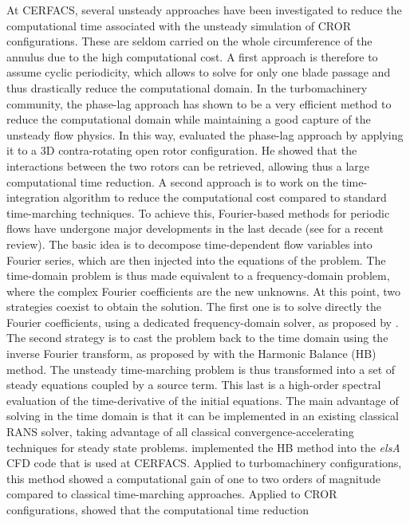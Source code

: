 At CERFACS, several unsteady approaches have been investigated 
to reduce the computational time associated with the unsteady simulation of 
CROR configurations. 
These are seldom carried on the whole
circumference of the annulus due to the high computational
cost. A first approach is therefore to assume cyclic periodicity,
which allows to solve for only one blade passage and thus drastically
reduce the computational domain. 
In the turbomachinery community, the phase-lag approach has shown to be
a very efficient method to reduce the computational domain while
maintaining a good capture of the unsteady flow physics. 
In this way, \citet{Burnazzi2010} evaluated the phase-lag approach
by applying it
to a 3D contra-rotating open rotor configuration. He showed
that the interactions between the two rotors can be retrieved, allowing
thus a large computational time reduction.
A second approach 
is to work on the time-integration algorithm to reduce
the computational cost compared to standard time-marching techniques. To achieve
this, Fourier-based methods for periodic flows have undergone major
developments in the last decade (see \citet{He2010} for a recent
review).  The basic idea is to decompose
time-dependent flow variables into Fourier series, which are then
injected into the equations of the problem. The time-domain problem is
thus made equivalent to a frequency-domain problem, where the complex
Fourier coefficients are the new unknowns. At this point, two
strategies coexist to obtain the solution. The first one is to solve
directly the Fourier coefficients, using a dedicated
frequency-domain solver, as proposed by \citet{He1998}. The second strategy is to cast the
problem back to the time domain using the inverse Fourier transform, as
proposed by \citet{Hall2002} with the Harmonic
Balance (HB) method. The unsteady time-marching problem is thus
transformed into a set of steady equations coupled by a source term.
This last is a high-order spectral evaluation of the time-derivative of the
initial equations. The main advantage of solving in the time domain is
that it can be implemented in an existing classical RANS solver,
taking advantage of all classical convergence-accelerating techniques
for steady state problems.
\citet{ThesisSicot} implemented
the HB method into the \textit{elsA}~\cite{Cambier2013} CFD code
that is used at CERFACS. Applied to turbomachinery
configurations, this method showed a computational gain
of one to two orders of magnitude 
compared to classical time-marching approaches.
Applied to CROR configurations, \citet{Yabili2010}
showed that the computational time reduction
